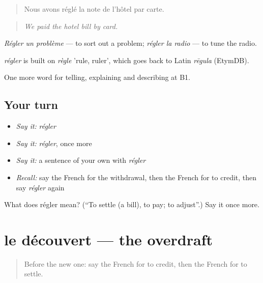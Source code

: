 \begin{quote}
Nous avons réglé la note de l'hôtel par carte.
\end{quote}

\begin{quote}
\emph{We paid the hotel bill by card.}
\end{quote}

\emph{Régler un problème} — to sort out a problem; \emph{régler la radio} — to tune the radio.

\begin{cousinweb}
\emph{régler} is built on \emph{règle} 'rule, ruler', which goes back to Latin \emph{rēgula} (EtymDB).
\end{cousinweb}

\begin{grammarlens}[title={What you've built}]
One more word for telling, explaining and describing at B1.
\end{grammarlens}

\subsection*{Your turn}
\begin{itemize}
\raggedright
  \item \emph{Say it:} \emph{régler}
  \item \emph{Say it:} \emph{régler}, once more
  \item \emph{Say it:} a sentence of your own with \emph{régler}
  \item \emph{Recall:} say the French for the withdrawal, then the French for to credit, then say \emph{régler} again
\end{itemize}

\begin{tcolorbox}[breakable,colback=teal!4,colframe=teal!35!black,title={Before you move on}]
What does régler mean? (\textquotedblleft{}To settle (a bill), to pay; to adjust\textquotedblright{}.) Say it once more.
\end{tcolorbox}
\section[le découvert]{le découvert — the overdraft}

\label{lesson:FR-C451-decouvert}



\begin{quote}
Before the new one: say the French for to credit, then the French for to settle.
\end{quote}

